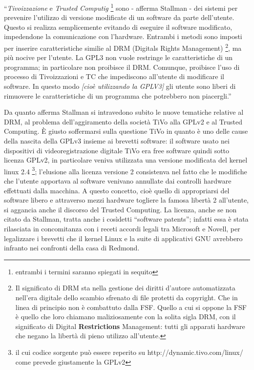 
``\textit{Tivoizzazione} e \textit{Trusted Computig} \footnote{entrambi i termini saranno spiegati in sequito} sono - afferma Stallman - dei sistemi per prevenire l'utilizzo di versione modificate di un software da parte dell'utente. Questo si realizza semplicemente evitando di eseguire il software modificato, impedendone la comunicazione con l'hardware. Entrambi i metodi sono imposti per inserire caratteristiche similie al DRM (Digitals Rights Management) \footnote{Il significato di DRM sta nella gestione dei diritti d'autore automatizzata nell'era digitale dello scambio sfrenato di file protetti da copyright. Che in linea di principio non è combattuto dalla FSF. Quello a cui si oppone la FSF è quello che loro chiamano maliziosamente con la solita sigla DRM, con il significato di Digital \textbf{Restrictions} Management: tutti gli apparati hardware che negano la libertà di pieno utilizzo all'utente.}, ma più nocive per l'utente. La GPL3 non vuole restringe le caratteristiche di un programma; in particolare non proibisce il DRM. Comunque, proibisce l'uso di processo di Tivoizzazioni e TC che impediscono all'utente di modificare il software. In questo modo \textit{[cioè utilizzando la GPLV3]} gli utente sono liberi di rimuovere le caratteristiche di un programma che potrebbero non piacergli.''

Da quanto afferma Stallman si intravedono subito le nuove tematiche relative al DRM, al problema dell'aggiramento della società TiVo alla GPLv2 e al Trusted Computing. \`E giusto soffermarsi sulla questione TiVo in quanto è uno delle cause della nascita della GPLv3 insieme ai brevetti software: il software usato nei dispositivi di videoregistrazione digitale TiVo era free software quindi sotto licenza GPLv2, in particolare veniva utilizzata una versione modificata del kernel linux 2.4 \footnote{il cui codice sorgente può essere reperito su http://dynamic.tivo.com/linux/ come prevede giustamente la GPLv2 }; l'elusione alla licenza versione 2 consistenva nel fatto che le modifiche che l'utente apportava al software venivano annullate dai controlli hardware effettuati dalla macchina. A questo concetto, cioè quello di appropriarsi del software libero e attraverso mezzi hardware togliere la famosa libertà 2 all'utente, si aggancia anche il discorso del Trusted Computing. La licenza, anche se non citato da Stallman, tratta anche i cosìdetti ``software patents''; infatti essa è stata rilasciata in concomitanza con i receti accordi legali tra Microsoft e Novell, per legalizzare i brevetti che il kernel Linux e la suite di applicativi GNU avrebbero infranto nei confronti della casa di Redmond.

